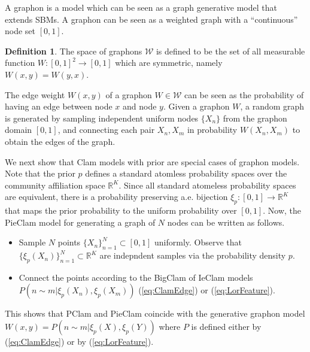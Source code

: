 \documentclass{article}
\theoremstyle{plain}
\theoremstyle{definition}
\newtheorem{definition}[theorem]{Definition}
\theoremstyle{remark}
\begin{document}
A graphon is a model which can be seen as a graph generative model that extends SBMs.
A graphon \cite{graphon1,cut-homo3} can be seen as a weighted graph with a ``continuous'' node set $[0,1]$. %
%




\begin{definition}
    The space of graphons $\mathcal{W}$ is defined to be the set of all measurable function  $W:[0,1]^2\rightarrow [0,1]$ which are symmetric, namely $W(x,y)=W(y,x)$. 
\end{definition}
%
%
The edge weight $W(x,y)$ of a graphon $W\in \mathcal{W}$ can be seen as the probability of having an edge between node $x$ and node $y$.   Given a graphon $W$, a random graph is generated by sampling  independent uniform nodes $\{X_n\}$ from the graphon domain $[0,1]$, and connecting each pair $X_n,X_m$ in probability $W(X_n,X_m)$ to obtain the edges of the graph.

We next show that Clam models with prior are special cases of graphon models. 
Note that the prior $p$ defines a standard atomless probability spaces over the community affiliation space $\mathbb{R}^K$. Since all standard atomeless probability spaces are equivalent, there is a probability preserving a.e. bijection  $\xi_p:[0,1]\rightarrow\mathbb{R}^K$ that maps the prior probability to the uniform probability over $[0,1]$. Now, the PieClam model for generating a graph of $N$ nodes can be written as follows.
\begin{itemize}
    \item 
    Sample $N$ points $\{X_n\}_{n=1}^N\subset[0,1]$ uniformly. Observe that $\{\xi_p(X_n)\}_{n=1}^N\subset \mathbb{R}^K$ are indepndent samples via the probability density $p$.
    \item 
    Connect the points according to the BigClam of IeClam models $P(n\sim m| \xi_p(X_n),\xi_p(X_m))$ (\ref{eq:ClamEdge}) or (\ref{eq:LorFeature}).
\end{itemize}
This shows that PClam and PieClam coincide with the generative graphon model $W(x,y)=P(n\sim m| \xi_p(X),\xi_p(Y))$ where $P$ is defined either by  (\ref{eq:ClamEdge}) or by (\ref{eq:LorFeature}).
\end{document}
